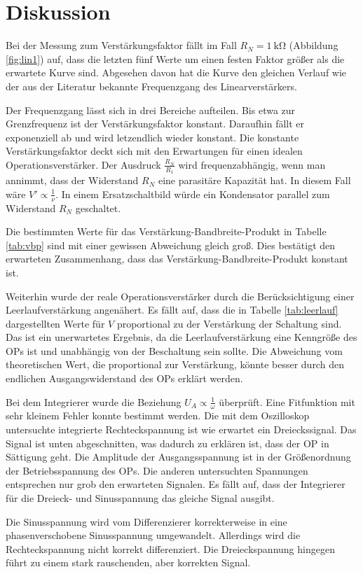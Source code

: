 \section{Diskussion}
Bei der Messung zum Verstärkungsfaktor fällt im Fall $R_N = \SI{1}{\kilo \ohm}$ (Abbildung \ref{fig:lin1}) auf, dass die letzten fünf Werte um einen festen Faktor größer als die erwartete Kurve sind.
Abgesehen davon hat die Kurve den gleichen Verlauf wie der aus der  Literatur bekannte Frequenzgang des Linearverstärkers.

Der Frequenzgang lässt sich in drei Bereiche aufteilen.
Bis etwa zur Grenzfrequenz ist der Verstärkungsfaktor konstant.
Daraufhin fällt er exponenziell ab und wird letzendlich wieder konstant.
Die konstante Verstärkungsfaktor deckt sich mit den Erwartungen für einen idealen Operationsverstärker.
Der Ausdruck $\frac{R_N}{R_1}$ wird frequenzabhängig, wenn man annimmt, dass der Widerstand $R_N$ eine parasitäre Kapazität hat.
In diesem Fall wäre $V' \propto \frac{1}{\nu}$.
In einem Ersatzschaltbild würde ein Kondensator parallel zum Widerstand $R_N$ geschaltet.

Die bestimmten Werte für das Verstärkung-Bandbreite-Produkt in Tabelle \ref{tab:vbp} sind mit einer gewissen Abweichung gleich groß.
Dies bestätigt den erwarteten Zusammenhang, dass das Verstärkung-Bandbreite-Produkt konstant ist.

Weiterhin wurde der reale Operationsverstärker durch die Berücksichtigung einer Leerlaufverstärkung angenähert.
Es fällt auf, dass die in Tabelle \ref{tab:leerlauf} dargestellten Werte für $V$ proportional zu der Verstärkung der Schaltung sind.
Das ist ein unerwartetes Ergebnis, da die Leerlaufverstärkung eine Kenngröße des OPs ist und unabhängig von der Beschaltung sein sollte.
Die Abweichung vom theoretischen Wert, die proportional zur Verstärkung, könnte besser durch den endlichen Ausgangswiderstand des OPs erklärt werden.

Bei dem Integrierer wurde die Beziehung $U_A \propto \frac{1}{\omega}$ überprüft.
Eine Fitfunktion mit sehr kleinem Fehler konnte bestimmt werden.
Die mit dem Oszilloskop untersuchte integrierte Rechteckspannung ist wie erwartet ein Dreieckssignal.
Das Signal ist unten abgeschnitten, was dadurch zu erklären ist, dass der OP in Sättigung geht.
Die Amplitude der Ausgangsspannung ist in der Größenordnung der Betriebsspannung des OPs.
Die anderen untersuchten Spannungen entsprechen nur grob den erwarteten Signalen.
Es fällt auf, dass der Integrierer für die Dreieck- und Sinusspannung das gleiche Signal ausgibt.

Die Sinusspannung wird vom Differenzierer korrekterweise in eine phasenverschobene Sinusspannung umgewandelt.
Allerdings wird die Rechteckspannung nicht korrekt differenziert.
Die Dreieckspannung hingegen führt zu einem stark rauschenden, aber korrekten Signal.
